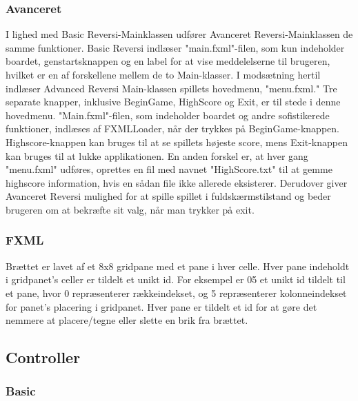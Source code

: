\subsubsection{Avanceret} \label{am}
I lighed med Basic Reversi-Mainklassen udfører Avanceret Reversi-Mainklassen de samme funktioner. Basic Reversi indlæser "main.fxml"-filen, som kun indeholder boardet, genstartsknappen og en label for at vise meddelelserne til brugeren, hvilket er en af forskellene mellem de to Main-klasser. I modsætning hertil indlæser Advanced Reversi Main-klassen spillets hovedmenu, "menu.fxml." Tre separate knapper, inklusive BeginGame, HighScore og Exit, er til stede i denne hovedmenu. "Main.fxml"-filen, som indeholder boardet og andre sofistikerede funktioner, indlæses af FXMLLoader, når der trykkes på BeginGame-knappen. Highscore-knappen kan bruges til at se spillets højeste score, mens Exit-knappen kan bruges til at lukke applikationen. En anden forskel er, at hver gang "menu.fxml" udføres, oprettes en fil med navnet "HighScore.txt" til at gemme  highscore information, hvis en sådan file ikke allerede eksisterer. Derudover giver Avanceret Reversi mulighed for at spille spillet i fuldskærmstilstand og beder brugeren om at bekræfte sit valg, når man trykker på exit.

\subsubsection{FXML}\label{BD}
Brættet er lavet af et 8x8 gridpane med et pane i hver celle. Hver pane indeholdt i gridpanet's celler er tildelt et unikt id. For eksempel er 05 et unikt id tildelt til et pane, hvor 0 repræsenterer rækkeindekset, og 5 repræsenterer kolonneindekset for panet's placering i gridpanet. Hver pane er tildelt et id for at gøre det nemmere at placere/tegne eller slette en brik fra brættet.


\subsection{Controller}

\subsubsection{Basic}


